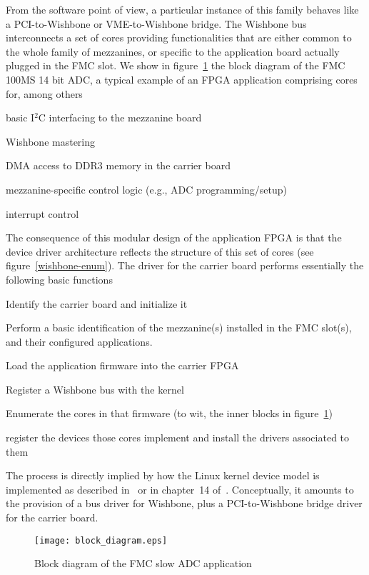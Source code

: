 \documentclass{JAC2003}
\begin{document}
From the software
point of view, a particular instance of this family behaves like a
PCI-to-Wishbone or VME-to-Wishbone bridge. The Wishbone bus
interconnects a set of cores providing functionalities that are either
common to the whole family of mezzanines, or specific to the application
board actually plugged in the FMC slot. We show in figure~\ref{slow-adc}
the block diagram of the FMC 100MS 14 bit ADC,
a typical example of an FPGA application comprising cores for, among
others
\begin{Itemize}
\item basic I${}^2$C interfacing to the mezzanine board
\item Wishbone mastering
\item DMA access to DDR3 memory in the carrier board
\item mezzanine-specific control logic (e.g., ADC programming/setup)
\item interrupt control
\end{Itemize}
The consequence of this modular design of the application FPGA is that
the device driver architecture reflects the structure of this set of
cores (see figure~\ref{wishbone-enum}). The driver for the carrier board
performs essentially the following basic functions
\begin{Itemize}
\item Identify the carrier board and initialize it
\item Perform a basic identification of the mezzanine(s) installed in
    the FMC slot(s), and their configured applications.
\item Load the application firmware into the carrier FPGA
\item Register a Wishbone bus with the kernel
\item Enumerate the cores in that firmware (to wit, the
    inner blocks in figure~\ref{slow-adc})
\item register the devices those cores implement and install the drivers 
    associated to them
\end{Itemize}
The process is directly implied by how the Linux kernel device
model is implemented as described in~\cite{device-model} or in chapter~14
of~\cite{rubini}. Conceptually, it amounts to the provision of a bus driver
for Wishbone, plus a PCI-to-Wishbone bridge driver for the
carrier board.

\begin{figure}[t]
   \centering
   \texttt{[image: block\_diagram.eps]}
   \caption{Block diagram of the FMC slow ADC application}
   \label{slow-adc}
\end{figure}
\end{document}
